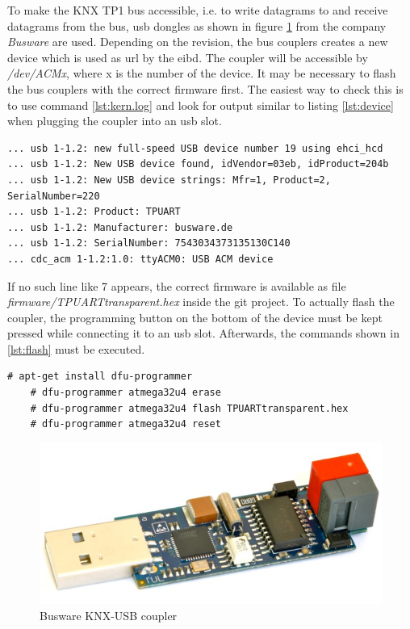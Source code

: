 To make the KNX TP1 bus accessible, i.e. to write datagrams to and receive datagrams from the bus, \gls{usb} dongles as shown in figure \ref{fig:busware}
from the company \textit{Busware} are used. Depending on the revision, the bus couplers creates a new device which is used as \gls{url} by the \gls{eibd}.
The coupler will be accessible by \textit{/dev/ACMx}, where x is the number of the device. It may be necessary to flash the bus couplers with the correct
firmware first. The easiest way to check this is to use command \ref{lst:kern.log} and look for output similar to listing \ref{lst:device} when plugging 
the coupler into an \gls{usb} slot.

\begin{lstlisting}[style=BashInputStyle,label=lst:device]
... usb 1-1.2: new full-speed USB device number 19 using ehci_hcd
... usb 1-1.2: New USB device found, idVendor=03eb, idProduct=204b
... usb 1-1.2: New USB device strings: Mfr=1, Product=2, SerialNumber=220
... usb 1-1.2: Product: TPUART
... usb 1-1.2: Manufacturer: busware.de
... usb 1-1.2: SerialNumber: 7543034373135130C140
... cdc_acm 1-1.2:1.0: ttyACM0: USB ACM device
\end{lstlisting}

If no such line like 7 appears, the correct firmware is available as file \textit{firmware/TPUARTtransparent.hex} inside the git project. To actually flash the 
coupler, the programming button on the bottom of the device must be kept pressed while connecting it to an \gls{usb} slot. Afterwards, the commands shown
in \ref{lst:flash} must be executed.

\begin{lstlisting}[style=BashInputStyle,label=lst:flash]
    # apt-get install dfu-programmer
    # dfu-programmer atmega32u4 erase
    # dfu-programmer atmega32u4 flash TPUARTtransparent.hex
    # dfu-programmer atmega32u4 reset
\end{lstlisting}


\begin{figure}
    \centering
    \caption{Busware KNX-USB coupler}
    \label{fig:busware}
\includegraphics[scale=0.2]{figures/busware.png}
\end{figure}

